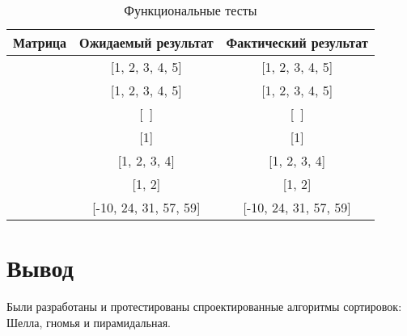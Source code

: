 \begin{table}[ht]
	\small
	\begin{center}
		\begin{threeparttable}
			\caption{Функциональные тесты}
			\label{tbl:func_tests}
			\begin{tabular}{|c|c|c|}
				\hline
				\bfseries Матрица
				& \bfseries Ожидаемый результат
				& \bfseries Фактический результат \\ 
				\hline
				[1, 2, 3, 4, 5] & [1, 2, 3, 4, 5] & [1, 2, 3, 4, 5] \\
				\hline
				[5, 4, 3, 2, 1]  & [1, 2, 3, 4, 5] & [1, 2, 3, 4, 5] \\
				\hline
				[~]  & [~] & [~] \\
				\hline
				[1]  & [1] & [1]\\
				\hline
				[4, 1, 2, 3]  & [1, 2, 3, 4] & [1, 2, 3, 4] \\
				\hline
				[2, 1]  & [1, 2] & [1, 2] \\
				\hline
				[31, 57, 24, -10, 59]  & [-10, 24, 31, 57, 59] & [-10, 24, 31, 57, 59] \\
				\hline
			\end{tabular}	
		\end{threeparttable}	
	\end{center}
\end{table}


\section*{Вывод}
Были разработаны и протестированы спроектированные алгоритмы сортировок:
Шелла, гномья и пирамидальная.